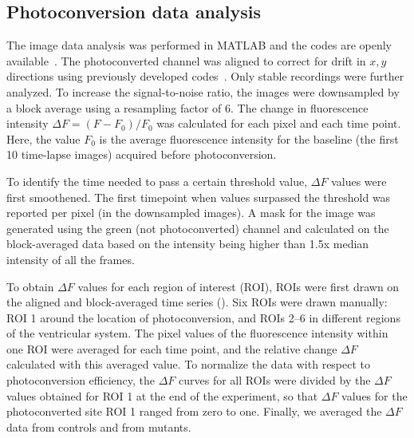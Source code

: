 \documentclass{WileyMSP-template}
\begin{document}
\subsection{Photoconversion data analysis}
The image data analysis was performed in MATLAB and the codes are
openly available~.  The
photoconverted channel was aligned to correct for drift in $x,y$
directions using previously developed
codes~\cite{Reiten2017Motile-Cilia-MediatedComputations,
  Ringers2023NovelEpithelia}.  Only stable recordings were further
analyzed.  To increase the signal-to-noise ratio, the images were
downsampled by a block average using a resampling factor of 6. 
The change in fluorescence intensity
$\Delta F = (F-F_0)/F_0$ was
calculated for each pixel and each time point.  Here, the
value $F_0$ is the average fluorescence intensity for the baseline
(the first 10 time-lapse images) acquired before photoconversion.

To identify the time needed to pass a certain threshold value,
$\Delta F$ values were first smoothened.
The first timepoint when values surpassed the threshold was reported
per pixel (in the downsampled images).
A mask for the image was generated using the green (not photoconverted)
channel and calculated on the block-averaged data based on the intensity
being higher than 1.5x median intensity of all the frames.

To obtain $\Delta F$ values for each region of interest (ROI), ROIs were
first drawn on the aligned and block-averaged time series ().
Six ROIs were drawn manually: ROI 1 around the location of photoconversion,
and ROIs 2--6 in different regions of the ventricular system.
The pixel values of the fluorescence intensity within one ROI were
averaged for each time point, and the relative change $\Delta F$ calculated with this averaged value.
To normalize the data with respect to photoconversion efficiency, the
$\Delta F$ curves for all ROIs were divided by the $\Delta F$ values
obtained for ROI 1 at the end of the experiment,
so that $\Delta F$ values for the photoconverted site ROI 1 ranged from
zero to one. Finally, we averaged the $\Delta F$ data from controls and from mutants.
\end{document}
